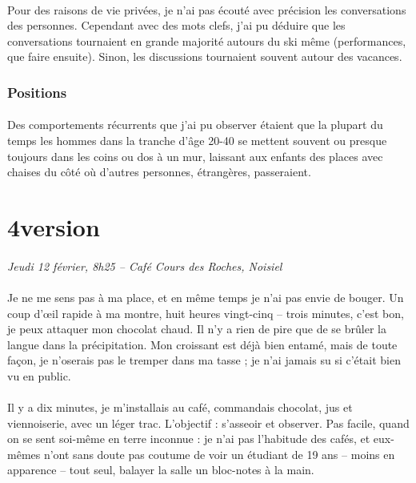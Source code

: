 \paragraph{}
Pour des raisons de vie privées, je n'ai pas écouté avec précision les
conversations des personnes. Cependant avec des mots clefs, j'ai pu déduire
que les conversations tournaient en grande majorité autours du ski même
(performances, que faire ensuite). Sinon, les discussions tournaient souvent
autour des vacances.

\subsubsection{Positions}
\paragraph{}
Des comportements récurrents que j'ai pu observer étaient que la plupart du
temps les hommes dans la tranche d'âge 20-40 se mettent souvent ou presque
toujours dans les coins ou dos à un mur, laissant aux enfants des places avec
chaises du côté où d'autres personnes, étrangères, passeraient.

\section{4\ieme version}
\paragraph{}
\emph{Jeudi 12 février, 8h25 – Café Cours des Roches, Noisiel}

\paragraph{}
Je ne me sens pas à ma place, et en même temps je n’ai pas envie de bouger. Un
coup d’œil rapide à ma montre, huit heures vingt-cinq – trois minutes, c’est
bon, je peux attaquer mon chocolat chaud. Il n’y a rien de pire que de se
brûler la langue dans la précipitation. Mon croissant est déjà bien entamé,
mais de toute façon, je n’oserais pas le tremper dans ma tasse ; je n’ai jamais
su si c’était bien vu en public.

\paragraph{}
Il y a dix minutes, je m’installais au café, commandais chocolat, jus et
viennoiserie, avec un léger trac. L’objectif : s’asseoir et observer. Pas
facile, quand on se sent soi-même en terre inconnue : je n’ai pas l’habitude
des cafés, et eux-mêmes n’ont sans doute pas coutume de voir un étudiant de 19
ans – moins en apparence – tout seul, balayer la salle un bloc-notes à la main.

